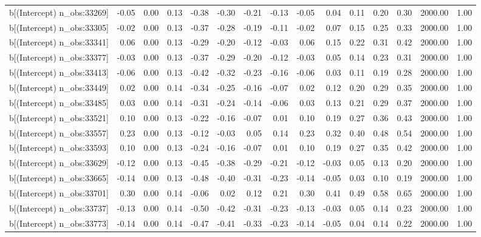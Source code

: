 \begin{table}[ht]
\begin{tabular}{rrrrrrrrrrrrrrr}
  b[(Intercept) n\_obs:33269] & -0.05 & 0.00 & 0.13 & -0.38 & -0.30 & -0.21 & -0.13 & -0.05 & 0.04 & 0.11 & 0.20 & 0.30 & 2000.00 & 1.00 \\ 
  b[(Intercept) n\_obs:33305] & -0.02 & 0.00 & 0.13 & -0.37 & -0.28 & -0.19 & -0.11 & -0.02 & 0.07 & 0.15 & 0.25 & 0.33 & 2000.00 & 1.00 \\ 
  b[(Intercept) n\_obs:33341] & 0.06 & 0.00 & 0.13 & -0.29 & -0.20 & -0.12 & -0.03 & 0.06 & 0.15 & 0.22 & 0.31 & 0.42 & 2000.00 & 1.00 \\ 
  b[(Intercept) n\_obs:33377] & -0.03 & 0.00 & 0.13 & -0.37 & -0.29 & -0.20 & -0.12 & -0.03 & 0.05 & 0.14 & 0.23 & 0.31 & 2000.00 & 1.00 \\ 
  b[(Intercept) n\_obs:33413] & -0.06 & 0.00 & 0.13 & -0.42 & -0.32 & -0.23 & -0.16 & -0.06 & 0.03 & 0.11 & 0.19 & 0.28 & 2000.00 & 1.00 \\ 
  b[(Intercept) n\_obs:33449] & 0.02 & 0.00 & 0.14 & -0.34 & -0.25 & -0.16 & -0.07 & 0.02 & 0.12 & 0.20 & 0.29 & 0.35 & 2000.00 & 1.00 \\ 
  b[(Intercept) n\_obs:33485] & 0.03 & 0.00 & 0.14 & -0.31 & -0.24 & -0.14 & -0.06 & 0.03 & 0.13 & 0.21 & 0.29 & 0.37 & 2000.00 & 1.00 \\ 
  b[(Intercept) n\_obs:33521] & 0.10 & 0.00 & 0.13 & -0.22 & -0.16 & -0.07 & 0.01 & 0.10 & 0.19 & 0.27 & 0.36 & 0.43 & 2000.00 & 1.00 \\ 
  b[(Intercept) n\_obs:33557] & 0.23 & 0.00 & 0.13 & -0.12 & -0.03 & 0.05 & 0.14 & 0.23 & 0.32 & 0.40 & 0.48 & 0.54 & 2000.00 & 1.00 \\ 
  b[(Intercept) n\_obs:33593] & 0.10 & 0.00 & 0.13 & -0.24 & -0.16 & -0.07 & 0.01 & 0.10 & 0.19 & 0.27 & 0.35 & 0.42 & 2000.00 & 1.00 \\ 
  b[(Intercept) n\_obs:33629] & -0.12 & 0.00 & 0.13 & -0.45 & -0.38 & -0.29 & -0.21 & -0.12 & -0.03 & 0.05 & 0.13 & 0.20 & 2000.00 & 1.00 \\ 
  b[(Intercept) n\_obs:33665] & -0.14 & 0.00 & 0.13 & -0.48 & -0.40 & -0.31 & -0.23 & -0.14 & -0.05 & 0.03 & 0.10 & 0.19 & 2000.00 & 1.00 \\ 
  b[(Intercept) n\_obs:33701] & 0.30 & 0.00 & 0.14 & -0.06 & 0.02 & 0.12 & 0.21 & 0.30 & 0.41 & 0.49 & 0.58 & 0.65 & 2000.00 & 1.00 \\ 
  b[(Intercept) n\_obs:33737] & -0.13 & 0.00 & 0.14 & -0.50 & -0.42 & -0.31 & -0.23 & -0.13 & -0.03 & 0.05 & 0.14 & 0.23 & 2000.00 & 1.00 \\ 
  b[(Intercept) n\_obs:33773] & -0.14 & 0.00 & 0.14 & -0.47 & -0.41 & -0.33 & -0.23 & -0.14 & -0.05 & 0.04 & 0.14 & 0.22 & 2000.00 & 1.00 \\ 

\end{tabular}
\end{table}
